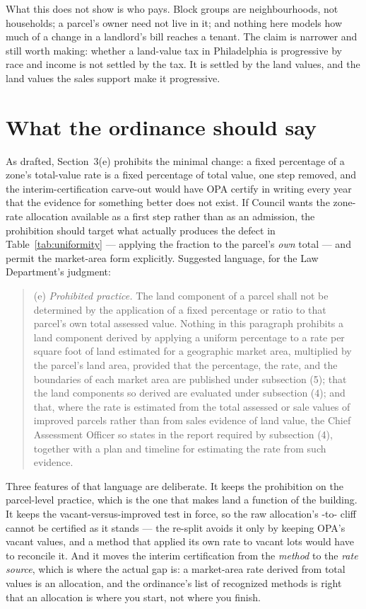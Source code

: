 \documentclass[11pt]{article}
\begin{document}
What this does not show is who pays. Block groups are neighbourhoods, not households; a parcel's
owner need not live in it; and nothing here models how much of a change in a landlord's bill
reaches a tenant. The claim is narrower and still worth making: whether a land-value tax in
Philadelphia is progressive by race and income is not settled by the tax. It is settled by the
land values, and the land values the sales support make it progressive.

\section{What the ordinance should say}\label{sec:language}

As drafted, Section~3(e) prohibits the minimal change: a fixed percentage of a zone's
total-value rate is a fixed percentage of total value, one step removed, and the
interim-certification carve-out would have OPA certify in writing every year that the evidence
for something better does not exist. If Council wants the zone-rate allocation available as a
first step rather than as an admission, the prohibition should target what actually produces
the defect in Table~\ref{tab:uniformity} --- applying the fraction to the parcel's \emph{own}
total --- and permit the market-area form explicitly. Suggested language, for the Law
Department's judgment:

\begin{quote}
\small
(e) \emph{Prohibited practice.} The land component of a parcel shall not be determined by the
application of a fixed percentage or ratio to that parcel's own total assessed value. Nothing
in this paragraph prohibits a land component derived by applying a uniform percentage to a
rate per square foot of land estimated for a geographic market area, multiplied by the
parcel's land area, provided that the percentage, the rate, and the boundaries of each
market area are published under subsection (5); that the land components so derived are
evaluated under subsection (4); and that, where the rate is estimated from the total assessed
or sale values of improved parcels rather than from sales evidence of land value, the Chief
Assessment Officer so states in the report required by subsection (4), together with a plan
and timeline for estimating the rate from such evidence.
\end{quote}

Three features of that language are deliberate. It keeps the prohibition on the parcel-level
practice, which is the one that makes land a function of the building. It keeps the
vacant-versus-improved test in force, so the raw allocation's \LycdLycdKVacant{}-to-\LycdLycdKImproved{}
cliff cannot be certified as it stands --- the re-split avoids it only by keeping OPA's vacant
values, and a method that applied its own rate to vacant lots would have to reconcile it.
And it moves the interim certification from the \emph{method} to the \emph{rate source}, which is
where the actual gap is: a market-area rate derived from total values is an allocation, and the
ordinance's list of recognized methods is right that an allocation is where you start, not
where you finish.
\end{document}
